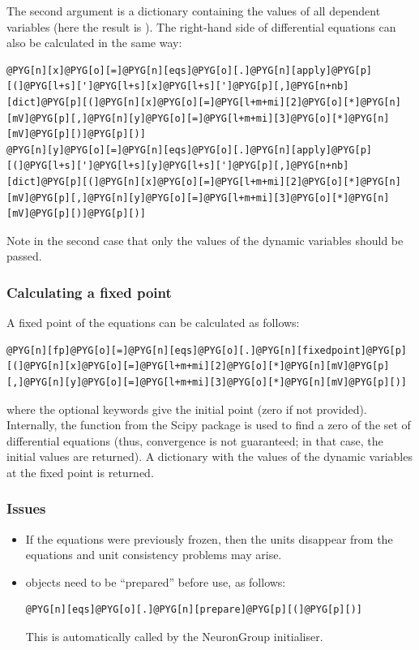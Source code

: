\documentclass[letterpaper,10pt,english]{manual}
\begin{document}
The second argument is a dictionary containing the values of all dependent variables
(here the result is ).
The right-hand side of differential equations can also be calculated in the same way:

\begin{Verbatim}[commandchars=@\[\]]
@PYG[n][x]@PYG[o][=]@PYG[n][eqs]@PYG[o][.]@PYG[n][apply]@PYG[p][(]@PYG[l+s][']@PYG[l+s][x]@PYG[l+s][']@PYG[p][,]@PYG[n+nb][dict]@PYG[p][(]@PYG[n][x]@PYG[o][=]@PYG[l+m+mi][2]@PYG[o][*]@PYG[n][mV]@PYG[p][,]@PYG[n][y]@PYG[o][=]@PYG[l+m+mi][3]@PYG[o][*]@PYG[n][mV]@PYG[p][)]@PYG[p][)]
@PYG[n][y]@PYG[o][=]@PYG[n][eqs]@PYG[o][.]@PYG[n][apply]@PYG[p][(]@PYG[l+s][']@PYG[l+s][y]@PYG[l+s][']@PYG[p][,]@PYG[n+nb][dict]@PYG[p][(]@PYG[n][x]@PYG[o][=]@PYG[l+m+mi][2]@PYG[o][*]@PYG[n][mV]@PYG[p][,]@PYG[n][y]@PYG[o][=]@PYG[l+m+mi][3]@PYG[o][*]@PYG[n][mV]@PYG[p][)]@PYG[p][)]
\end{Verbatim}

Note in the second case that only the values of the dynamic variables should be passed.

\subsubsection{Calculating a fixed point}

A fixed point of the equations can be calculated as follows:

\begin{Verbatim}[commandchars=@\[\]]
@PYG[n][fp]@PYG[o][=]@PYG[n][eqs]@PYG[o][.]@PYG[n][fixedpoint]@PYG[p][(]@PYG[n][x]@PYG[o][=]@PYG[l+m+mi][2]@PYG[o][*]@PYG[n][mV]@PYG[p][,]@PYG[n][y]@PYG[o][=]@PYG[l+m+mi][3]@PYG[o][*]@PYG[n][mV]@PYG[p][)]
\end{Verbatim}

where the optional keywords give the initial point (zero if not provided).
Internally, the function  from the Scipy package is used to
find a zero of the set of differential equations (thus, convergence is not
guaranteed; in that case, the initial values are returned).
A dictionary with the values of the dynamic variables at the fixed point is returned.


\subsubsection{Issues}
\begin{itemize}
\item {} 
If the equations were previously frozen, then the units disappear from the equations
and unit consistency problems may arise.

\item {} 
\hyperlink{brian.Equations}{} objects need to be ``prepared'' before use, as follows:

\begin{Verbatim}[commandchars=@\[\]]
@PYG[n][eqs]@PYG[o][.]@PYG[n][prepare]@PYG[p][(]@PYG[p][)]
\end{Verbatim}

This is automatically called by the NeuronGroup initialiser.

\end{itemize}
\end{document}

